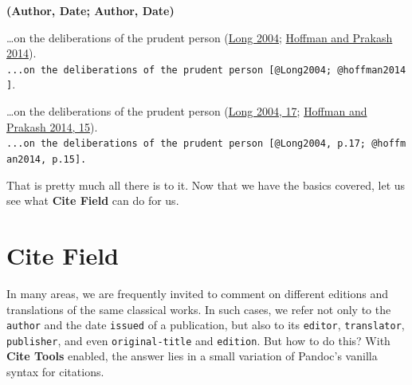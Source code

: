 \documentclass[
  12pt,
  a4paper,
  oneside,
  titlepage,
  toclink=all,
  toc=bibliography]{scrbook}
\theoremstyle{definition}
\theoremstyle{plain}
\theoremstyle{plain}
\theoremstyle{plain}
\theoremstyle{plain}
\theoremstyle{definition}
\theoremstyle{definition}
\theoremstyle{plain}
\theoremstyle{remark}
\begin{document}
\begin{tcolorbox}[enhanced jigsaw, left=2mm, colframe=quarto-callout-note-color-frame, colback=white, opacityback=0, breakable, toprule=.15mm, arc=.35mm, rightrule=.15mm, bottomrule=.15mm, leftrule=.75mm]
\begin{minipage}[t]{5.5mm}
\textcolor{quarto-callout-note-color}{\faInfo}
\end{minipage}%
\begin{minipage}[t]{\textwidth - 5.5mm}

\textbf{(Author, Date; Author, Date)}\vspace{2mm}

\ldots on the deliberations of the prudent person
\protect\hypertarget{cite_90}{}{\label{cite_90}(\protect\hyperlink{ref-Long2004}{Long
2004}; \protect\hyperlink{ref-hoffman2014}{Hoffman and Prakash 2014})}.
\texttt{...on\ the\ deliberations\ of\ the\ prudent\ person\ {[}@Long2004;\ @hoffman2014{]}}.

\ldots on the deliberations of the prudent person
\protect\hypertarget{cite_91}{}{\label{cite_91}(\protect\hyperlink{ref-Long2004}{Long
2004, 17}; \protect\hyperlink{ref-hoffman2014}{Hoffman and Prakash 2014,
15})}.
\texttt{...on\ the\ deliberations\ of\ the\ prudent\ person\ {[}@Long2004,\ p.17;\ @hoffman2014,\ p.15{]}.}

\end{minipage}%
\end{tcolorbox}

That is pretty much all there is to it. Now that we have the basics
covered, let us see what \textbf{Cite Field} can do for us.

\hypertarget{sec-scriv44}{%
\section{Cite Field}\label{sec-scriv44}}

\protect\hypertarget{scriv44}{}{}

In many areas, we are frequently invited to comment on different
editions and translations of the same classical works. In such cases, we
refer not only to the \texttt{author} and the date \texttt{issued} of a
publication, but also to its \texttt{editor}, \texttt{translator},
\texttt{publisher}, and even \texttt{original-title} and
\texttt{edition}. But how to do this? With \textbf{Cite Tools} enabled,
the answer lies in a small variation of Pandoc's vanilla syntax for
citations.
\end{document}
